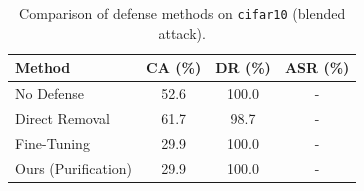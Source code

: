 \begin{table}[htbp]
\centering
\caption{Comparison of defense methods on \texttt{cifar10} (blended attack).}
\label{tab:results}
\begin{tabular}{lccc}
\toprule
Method & CA (\%) & DR (\%) & ASR (\%) \\
\midrule
  No Defense & 52.6 & 100.0 & - \\
  Direct Removal & 61.7 & 98.7 & - \\
  Fine-Tuning & 29.9 & 100.0 & - \\
  Ours (Purification) & 29.9 & 100.0 & - \\
\bottomrule
\end{tabular}
\end{table}